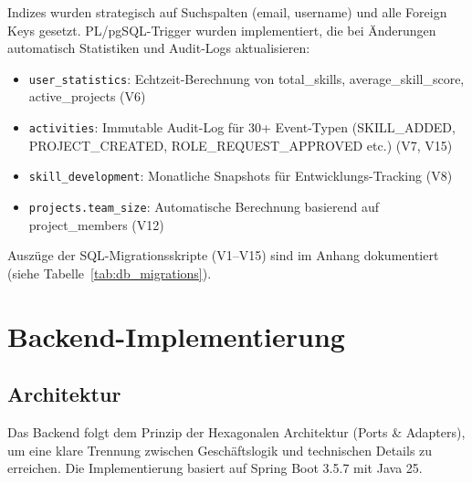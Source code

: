 Indizes wurden strategisch auf Suchspalten (email, username) und alle Foreign Keys gesetzt. PL/pgSQL-Trigger wurden implementiert, die bei Änderungen automatisch Statistiken und Audit-Logs aktualisieren:

\begin{itemize}[noitemsep]
    \item \texttt{user\_statistics}: Echtzeit-Berechnung von total\_skills, average\_skill\_score, active\_projects (V6)
    \item \texttt{activities}: Immutable Audit-Log für 30+ Event-Typen (SKILL\_ADDED, PROJECT\_CREATED, ROLE\_REQUEST\_APPROVED etc.) (V7, V15)
    \item \texttt{skill\_development}: Monatliche Snapshots für Entwicklungs-Tracking (V8)
    \item \texttt{projects.team\_size}: Automatische Berechnung basierend auf project\_members (V12)
\end{itemize}

Auszüge der SQL-Migrationsskripte (V1–V15) sind im Anhang dokumentiert (siehe Tabelle~\ref{tab:db_migrations}).

\section{Backend-Implementierung}

\subsection{Architektur}

Das Backend folgt dem Prinzip der Hexagonalen Architektur (Ports \& Adapters)\cite{hexagonal_architecture}, um eine klare Trennung zwischen Geschäftslogik und technischen Details zu erreichen. Die Implementierung basiert auf Spring Boot 3.5.7 mit Java 25\cite{spring_boot_docs}.


